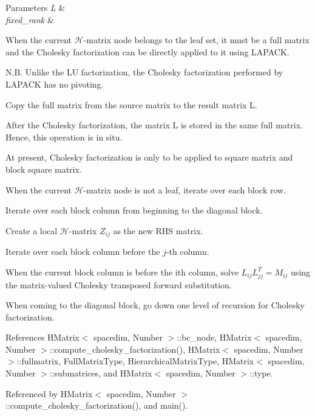 \begin{DoxyParams}{Parameters}
{\em L} & \\
\hline
{\em fixed\+\_\+rank} & \\
\hline
\end{DoxyParams}
When the current $\mathcal{H}$-\/matrix node belongs to the leaf set, it must be a full matrix and the Cholesky factorization can be directly applied to it using L\+A\+P\+A\+CK.

N.\+B. Unlike the LU factorization, the Cholesky factorization performed by L\+A\+P\+A\+CK has no pivoting.

Copy the full matrix from the source matrix to the result matrix {\ttfamily L}.

After the Cholesky factorization, the matrix {\ttfamily L} is stored in the same full matrix. Hence, this operation is in situ.

At present, Cholesky factorization is only to be applied to square matrix and block square matrix.

When the current $\mathcal{H}$-\/matrix node is not a leaf, iterate over each block row.

Iterate over each block column from beginning to the diagonal block.

Create a local $\mathcal{H}$-\/matrix $Z_{ij}$ as the new R\+HS matrix.

Iterate over each block column before the $j$-\/th column.

When the current block column is before the i\textquotesingle{}th column, solve $L_{ij} L_{jj}^T = M_{ij}$ using the matrix-\/valued Cholesky transposed forward substitution.

When coming to the diagonal block, go down one level of recursion for Cholesky factorization.

References H\+Matrix$<$ spacedim, Number $>$\+::bc\+\_\+node, H\+Matrix$<$ spacedim, Number $>$\+::compute\+\_\+cholesky\+\_\+factorization(), H\+Matrix$<$ spacedim, Number $>$\+::fullmatrix, Full\+Matrix\+Type, Hierarchical\+Matrix\+Type, H\+Matrix$<$ spacedim, Number $>$\+::submatrices, and H\+Matrix$<$ spacedim, Number $>$\+::type.



Referenced by H\+Matrix$<$ spacedim, Number $>$\+::compute\+\_\+cholesky\+\_\+factorization(), and main().

\mbox{\label{classHMatrix_abc6e787e46fb082579b2d3aea1ad54f6}} 

